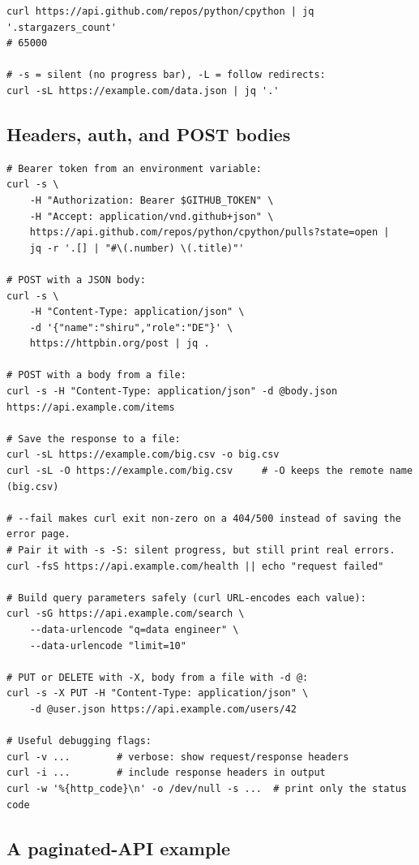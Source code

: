 \documentclass[11pt,a4paper]{article}
\begin{document}
\begin{lstlisting}[style=bashstyle]
curl https://api.github.com/repos/python/cpython | jq '.stargazers_count'
# 65000

# -s = silent (no progress bar), -L = follow redirects:
curl -sL https://example.com/data.json | jq '.'
\end{lstlisting}

\subsection*{Headers, auth, and POST bodies}

\begin{lstlisting}[style=bashstyle]
# Bearer token from an environment variable:
curl -s \
    -H "Authorization: Bearer $GITHUB_TOKEN" \
    -H "Accept: application/vnd.github+json" \
    https://api.github.com/repos/python/cpython/pulls?state=open |
    jq -r '.[] | "#\(.number) \(.title)"'

# POST with a JSON body:
curl -s \
    -H "Content-Type: application/json" \
    -d '{"name":"shiru","role":"DE"}' \
    https://httpbin.org/post | jq .

# POST with a body from a file:
curl -s -H "Content-Type: application/json" -d @body.json https://api.example.com/items

# Save the response to a file:
curl -sL https://example.com/big.csv -o big.csv
curl -sL -O https://example.com/big.csv     # -O keeps the remote name (big.csv)

# --fail makes curl exit non-zero on a 404/500 instead of saving the error page.
# Pair it with -s -S: silent progress, but still print real errors.
curl -fsS https://api.example.com/health || echo "request failed"

# Build query parameters safely (curl URL-encodes each value):
curl -sG https://api.example.com/search \
    --data-urlencode "q=data engineer" \
    --data-urlencode "limit=10"

# PUT or DELETE with -X, body from a file with -d @:
curl -s -X PUT -H "Content-Type: application/json" \
    -d @user.json https://api.example.com/users/42

# Useful debugging flags:
curl -v ...        # verbose: show request/response headers
curl -i ...        # include response headers in output
curl -w '%{http_code}\n' -o /dev/null -s ...  # print only the status code
\end{lstlisting}

\subsection*{A paginated-API example}
\end{document}
